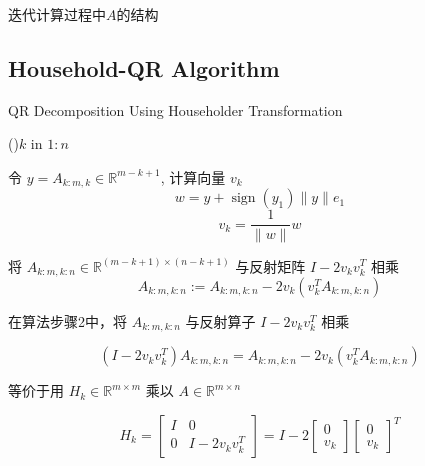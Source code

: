 \begin{FigureCenter}{迭代计算过程中$A$的结构}
\end{FigureCenter}

\subsection{Household-QR Algorithm}

\begin{algorithm}[htbp]
    \caption{QR Decomposition Using Householder Transformation}

    \For(){$k$ in $1:n$}{
        令 $ y=A_{k: m, k} \in \mathbb{R}^{m-k+1} $, 计算向量 $ v_{k} $
    $$ w=y+\operatorname{sign}\left(y_{1}\right)\|y\| e_{1}$$
    $$ v_{k}=\frac{1}{\|w\|} w $$\;

    将 $ A_{k: m, k: n} \in \mathbb{R}^{(m-k+1) \times(n-k+1)} $ 与反射矩阵 $ I-2 v_{k} v_{k}^{T} $ 相乘
    $$ A_{k: m, k: n}:=A_{k: m, k: n}-2 v_{k}\left(v_{k}^{T} A_{k: m, k: n}\right) $$\;
    }
\end{algorithm}

\begin{theorem}
     在算法步骤2中，将 $ A_{k: m, k: n} $ 与反射算子 $ I-2 v_{k} v_{k}^{T} $ 相乘

    $$ \left(I-2 v_{k} v_{k}^{T}\right) A_{k: m, k: n}=A_{k: m, k: n}-2 v_{k}\left(v_{k}^{T} A_{k: m, k: n}\right) $$

    等价于用 $ H_{k} \in \mathbb{R}^{m \times m} $ 乘以 $ A \in \mathbb{R}^{m \times n}  $

    $$ H_{k}=\left[\begin{array}{cc}I & 0 \\ 0 & I-2 v_{k} v_{k}^{T}\end{array}\right]=I-2\left[\begin{array}{c}0 \\ v_{k}\end{array}\right]\left[\begin{array}{l}0 \\ v_{k}\end{array}\right]^{T} $$
\end{theorem}

